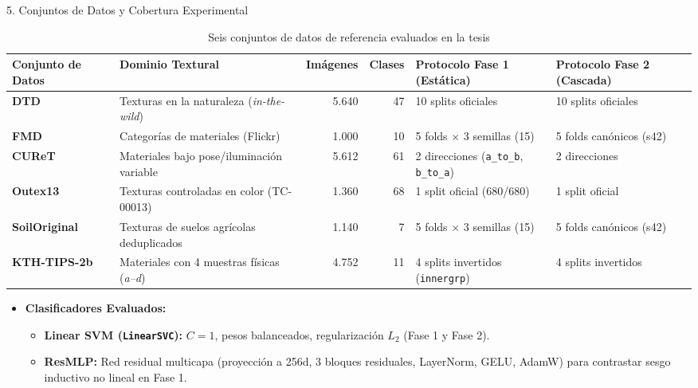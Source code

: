 \documentclass[aspectratio=169,10pt]{beamer}
\begin{document}
\begin{frame}{5. Conjuntos de Datos y Cobertura Experimental}
\begin{table}
\centering
\footnotesize
\caption{Seis conjuntos de datos de referencia evaluados en la tesis}
\begin{tabular}{@{}llrrll@{}}
\toprule
Conjunto de Datos & Dominio Textural & Imágenes & Clases & Protocolo Fase 1 (Estática) & Protocolo Fase 2 (Cascada) \\
\midrule
\textbf{DTD} & Texturas en la naturaleza (\emph{in-the-wild}) & 5.640 & 47 & 10 splits oficiales & 10 splits oficiales \\
\textbf{FMD} & Categorías de materiales (Flickr) & 1.000 & 10 & 5 folds $\times$ 3 semillas (15) & 5 folds canónicos (s42) \\
\textbf{CUReT} & Materiales bajo pose/iluminación variable & 5.612 & 61 & 2 direcciones (\texttt{a\_to\_b}, \texttt{b\_to\_a}) & 2 direcciones \\
\textbf{Outex13} & Texturas controladas en color (TC-00013) & 1.360 & 68 & 1 split oficial (680/680) & 1 split oficial \\
\textbf{SoilOriginal} & Texturas de suelos agrícolas deduplicados & 1.140 & 7 & 5 folds $\times$ 3 semillas (15) & 5 folds canónicos (s42) \\
\textbf{KTH-TIPS-2b} & Materiales con 4 muestras físicas (\emph{a--d}) & 4.752 & 11 & 4 splits invertidos (\texttt{innergrp}) & 4 splits invertidos \\
\bottomrule
\end{tabular}
\end{table}

\begin{itemize}
\item \textbf{Clasificadores Evaluados:}
  \begin{itemize}
  \item \textbf{Linear SVM (\texttt{LinearSVC}):} $C=1$, pesos balanceados, regularización $L_2$ (Fase 1 y Fase 2).
  \item \textbf{ResMLP:} Red residual multicapa (proyección a 256d, 3 bloques residuales, LayerNorm, GELU, AdamW) para contrastar sesgo inductivo no lineal en Fase 1.
  \end{itemize}
\end{itemize}
\end{frame}
\end{document}
